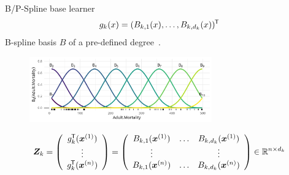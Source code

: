 \documentclass[t,10pt]{beamer}
\begin{document}
\begin{frame}{B/P-Spline base learner}
  \vspace{-0.3cm}\[g_k(x) = (B_{k,1}(x), \dots, B_{k,d_k}(x))^\tran\] B-spline basis $B$ of a pre-defined degree~\citep{eilers1996flexible}.
  \begin{center}
    \begin{figure}
      \includegraphics[width=0.7\textwidth]{figures/bs-base/fig-bs0.png}
    \end{figure}
    \vspace{-0.3cm}
    \[
    \design_k = \left(\begin{array}{c}
      g_{k}^\tran(\xi[1]) \\
      \vdots \\
      g_{k}^\tran(\xi[n])
    \end{array}\right) = \left(\begin{array}{ccc}
      B_{k,1}(\xi[1]) & \dots & B_{k,d_k}(\xi[1]) \\
      \vdots &  & \vdots \\
      B_{k,1}(\xi[n]) & \dots & B_{k,d_k}(\xi[n])
    \end{array}\right)\in\R^{n\times d_k}
    \]
  \end{center}

\end{frame}


\end{document}
